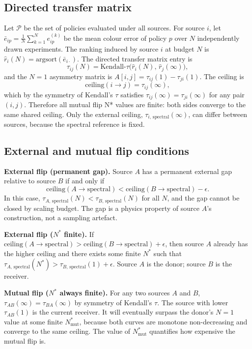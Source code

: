 \documentclass[twoside,twocolumn,9pt]{article}
\begin{document}
\subsection{Directed transfer matrix}

Let $\mathcal{P}$ be the set of policies evaluated under all sources. For source $i$, let $\bar{e}_{ip} = \frac{1}{N}\sum_{k=1}^N e_{ip}^{(k)}$ be the mean colour error of policy $p$ over $N$ independently drawn experiments. The ranking induced by source $i$ at budget $N$ is $\hat{r}_i(N) = \mathrm{argsort}(\bar{e}_{i\cdot})$. The directed transfer matrix entry is
\[
\tau_{ij}(N) = \mathrm{Kendall\text{-}}\tau\!\bigl(\hat{r}_i(N),\, \hat{r}_j(\infty)\bigr),
\]
and the $N=1$ asymmetry matrix is $A[i,j] = \tau_{ij}(1) - \tau_{ji}(1)$. The ceiling is
\[
\mathrm{ceiling}(i \to j) = \tau_{ij}(\infty),
\]
which by the symmetry of Kendall's $\tau$ satisfies $\tau_{ij}(\infty) = \tau_{ji}(\infty)$ for any pair $(i, j)$. Therefore all mutual flip N* values are finite: both sides converge to the same shared ceiling. Only the external ceiling, $\tau_{i,\,\mathrm{spectral}}(\infty)$, can differ between sources, because the spectral reference is fixed.

\subsection{External and mutual flip conditions}

\textbf{External flip (permanent gap).} Source $A$ has a permanent external gap relative to source $B$ if and only if
\[
\mathrm{ceiling}(A \to \mathrm{spectral}) < \mathrm{ceiling}(B \to \mathrm{spectral}) - \epsilon.
\]
In this case, $\tau_{A,\,\mathrm{spectral}}(N) < \tau_{B,\,\mathrm{spectral}}(N)$ for all $N$, and the gap cannot be closed by scaling budget. The gap is a physics property of source $A$'s construction, not a sampling artefact.

\textbf{External flip ($N^*$ finite).} If $\mathrm{ceiling}(A \to \mathrm{spectral}) > \mathrm{ceiling}(B \to \mathrm{spectral}) + \epsilon$, then source $A$ already has the higher ceiling and there exists some finite $N^*$ such that $\tau_{A,\,\mathrm{spectral}}(N^*) > \tau_{B,\,\mathrm{spectral}}(1) + \epsilon$. Source $A$ is the donor; source $B$ is the receiver.

\textbf{Mutual flip ($N^*$ always finite).} For any two sources $A$ and $B$, $\tau_{AB}(\infty) = \tau_{BA}(\infty)$ by symmetry of Kendall's $\tau$. The source with lower $\tau_{AB}(1)$ is the current receiver. It will eventually surpass the donor's $N=1$ value at some finite $N^*_{\mathrm{mut}}$, because both curves are monotone non-decreasing and converge to the same ceiling. The value of $N^*_{\mathrm{mut}}$ quantifies how expensive the mutual flip is.
\end{document}
